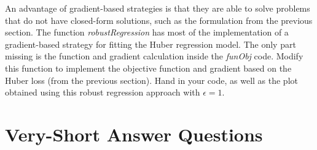 \documentclass{article}
\def\blu#1{{\color{blu}#1}}
\begin{document}
An advantage of gradient-based strategies is that they are able to solve problems that do not have closed-form solutions, such as the formulation from the previous section. The function \emph{robustRegression} has most of the implementation of a gradient-based strategy for fitting the Huber regression model. The only part missing is the function and gradient calculation inside the \emph{funObj} code. \blu{Modify this function to implement the objective function and gradient based on the Huber loss (from the previous section). Hand in your code, as well as the plot obtained using this robust regression approach with $\epsilon = 1$.}

\pagebreak

\section{Very-Short Answer Questions}
\end{document}
